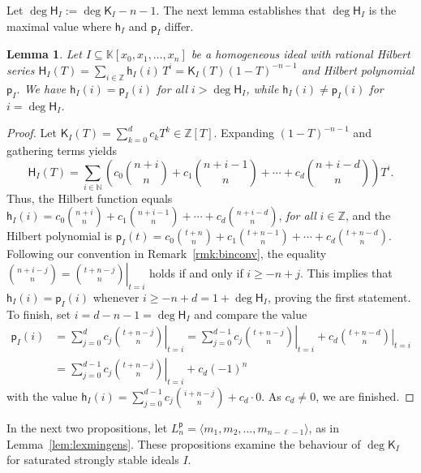 \documentclass[12pt]{amsart}%
\newtheorem{lemma}[theorem]{Lemma}
\theoremstyle{definition}%
\newcommand{\hf}{\mathsf{h}}%
\newcommand{\hp}{\mathsf{p}}%
\newcommand{\hs}{\mathsf{H}}%
\newcommand{\hk}{\mathsf{K}}%
\newcommand{\kk}{\mathbb{K}}%
\newcommand{\NN}{\mathbb{N}}%
\newcommand{\ZZ}{\mathbb{Z}}%
\begin{document}
Let $\deg \hs_{I} := \deg \hk_{I} - n-1$.  The next lemma establishes
that $\deg \hs_{I}$ is the maximal value where $\hf_I$ and $\hp_I$
differ.

\begin{lemma} 
  \label{lem:Kpolycoincide}
  Let $I \subseteq \kk[x_0, x_1, \dotsc, x_n]$ be a homogeneous ideal
  with rational Hilbert series
  $\hs_I( T ) = \sum_{i \in \ZZ} \hf_I(i) \, T^i = \hk_I( T
  )(1-T)^{-n-1}$
  and Hilbert polynomial $\hp_I$.  We have $\hf_I(i) = \hp_I(i)$ for
  all $i > \deg \hs_I$, while $\hf_I(i) \ne \hp_I(i)$ for
  $i = \deg \hs_I$.
\end{lemma}

\begin{proof}
  Let $\hk_I(T) = \sum_{k=0}^d c_k T^k \in \ZZ[T]$.  Expanding
  $(1-T)^{-n-1}$ and gathering terms yields
  \[
  \hs_I(T) = \sum_{i \in \NN} \left( c_0 \binom{n+i}{n} + c_1
  \binom{n+i-1}{n} + \dotsb + c_d \binom{n+i-d}{n} \right) T^i.
  \]
  Thus, the Hilbert function equals $\hf_I(i) = c_0 \binom{n+i}{n} +
  c_1 \binom{n+i-1}{n} + \dotsb + c_d \binom{n+i-d}{n}$, \emph{for
    all} $i \in \ZZ$, and the Hilbert polynomial is $\hp_I(t) = c_0
  \binom{t + n}{n} + c_1 \binom{t + n-1}{n} + \dotsb + c_d \binom{t +
    n-d}{n}$.  Following our convention in Remark~\ref{rmk:binconv},
  the equality $\binom{n+i-j}{n} = \left. \binom{t + n-j}{n}
  \right\rvert_{t=i}$ holds if and only if $i \ge -n+j$.  This implies
  that $\hf_I(i) = \hp_I(i)$ whenever $i \ge -n+d = 1 + \deg \hs_I$,
  proving the first statement.  To finish, set $i = d - n-1 = \deg
  \hs_I$ and compare the value
  \begin{align*}
    \hp_I(i) &= \sum_{j=0}^d c_j \left. \binom{t + n-j}{n}
               \right\rvert_{t=i} = \sum_{j=0}^{d-1} c_j
               \left. \binom{t + n-j}{n} \right\rvert_{t=i} + c_d
               \left. \binom{t + n-d}{n} \right\rvert_{t=i} \\
             &= \sum_{j=0}^{d-1} c_j \left. \binom{t + n-j}{n}
               \right\rvert_{t=i} + c_d (-1)^n 
  \end{align*}
  with the value
  $\hf_I(i) = \sum_{j=0}^{d-1} c_j \binom{i+n-j}{n} + c_d \cdot 0$.
  As $c_d \ne 0$, we are finished.
\end{proof}

In the next two propositions, let $L^{\hp}_n = \langle m_1, m_2,
\dotsc, m_{n-\ell-1} \rangle$, as in Lemma~\ref{lem:lexmingens}.
These propositions examine the behaviour of $\deg \hk_I$ for saturated
strongly stable ideals $I$.
\end{document}
